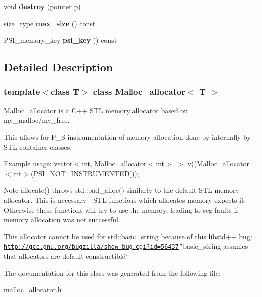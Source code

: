 \begin{DoxyCompactItemize}
\item 
\mbox{\label{classMalloc__allocator_a9870063dadea8af6e85575dfa1199c6e}} 
void {\bfseries destroy} (pointer p)
\item 
\mbox{\label{classMalloc__allocator_a1b2eeae16c363cbfd7085cca13d93099}} 
size\+\_\+type {\bfseries max\+\_\+size} () const
\item 
\mbox{\label{classMalloc__allocator_a20a3ae763a1dc1c931f667717ecd584f}} 
P\+S\+I\+\_\+memory\+\_\+key {\bfseries psi\+\_\+key} () const
\end{DoxyCompactItemize}


\subsection{Detailed Description}
\subsubsection*{template$<$class T$>$\newline
class Malloc\+\_\+allocator$<$ T $>$}

\mbox{\hyperlink{classMalloc__allocator}{Malloc\+\_\+allocator}} is a C++ S\+TL memory allocator based on my\+\_\+malloc/my\+\_\+free.

This allows for P\+\_\+S instrumentation of memory allocation done by internally by S\+TL container classes.

Example usage\+: vector$<$int, Malloc\+\_\+allocator$<$int$>$ $>$ v((Malloc\+\_\+allocator$<$int$>$(\+P\+S\+I\+\_\+\+N\+O\+T\+\_\+\+I\+N\+S\+T\+R\+U\+M\+E\+N\+T\+E\+D)));

\begin{DoxyNote}{Note}
allocate() throws std\+::bad\+\_\+alloc() similarly to the default S\+TL memory allocator. This is necessary -\/ S\+TL functions which allocates memory expects it. Otherwise these functions will try to use the memory, leading to seg faults if memory allocation was not successful.

This allocator cannot be used for std\+::basic\+\_\+string because of this libstd++ bug\+: \href{http://gcc.gnu.org/bugzilla/show_bug.cgi?id=56437}\texttt{ http\+://gcc.\+gnu.\+org/bugzilla/show\+\_\+bug.\+cgi?id=56437} \char`\"{}basic\+\_\+string assumes that allocators are default-\/constructible\char`\"{} 
\end{DoxyNote}


The documentation for this class was generated from the following file\+:\begin{DoxyCompactItemize}
\item 
malloc\+\_\+allocator.\+h\end{DoxyCompactItemize}
